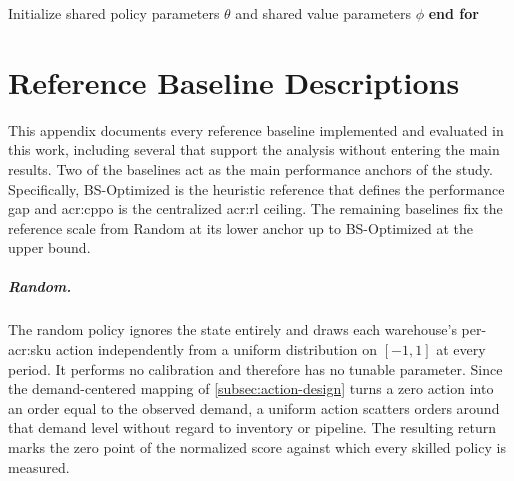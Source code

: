 \begin{algorithm}[H]
\DontPrintSemicolon
\caption{\gls{acr:mappo} with parameter sharing \citep{yu2022surprising}}
\label{alg:mappo}
\BlankLine
Initialize shared policy parameters $\theta$ and shared value parameters $\phi$\;
\textbf{end for}
\end{algorithm}





\newpage
\chapter{Reference Baseline Descriptions}
\label{ap:baselines}

This appendix documents every reference baseline implemented and evaluated in this work, including several that support the analysis without entering the main results. Two of the baselines act as the main performance anchors of the study. Specifically, BS-Optimized is the heuristic reference that defines the performance gap and \gls{acr:cppo} is the centralized \gls{acr:rl} ceiling. The remaining baselines fix the reference scale from Random at its
lower anchor up to BS-Optimized at the upper bound. 

\paragraph{\textbf{Random.}} The random policy ignores the state entirely and draws each
warehouse's per-\gls{acr:sku} action independently from a uniform distribution on
$[-1,1]$ at every period. It performs no calibration and therefore has no tunable
parameter. Since the demand-centered mapping of \autoref{subsec:action-design} turns
a zero action into an order equal to the observed demand, a uniform action scatters
orders around that demand level without regard to inventory or pipeline. The
resulting return marks the zero point of the normalized score against which every
skilled policy is measured.

